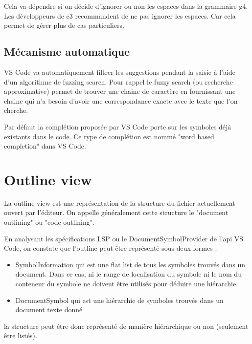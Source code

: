 \documentclass[
    iict, %
    il, %
]{heig-tb}
\begin{document}
Cela va dépendre si on décide d'ignorer ou non les espaces dans la grammaire g4.
Les développeurs de c3 recommandent de ne pas ignorer les espaces. Car cela permet de gérer plus de cas particuliers.

\subsection{Mécanisme automatique}
VS Code va automatiquement filtrer les suggestions pendant la saisie à l'aide d'un algorithme de fuzzing search.
Pour rappel le fuzzy search (ou recherche approximative) permet de trouver une chaine de caractère en fournissant une chaine qui n'a besoin d'avoir une correspondance exacte
avec le texte que l'on cherche.

Par défaut la complétion proposée par VS Code porte sur les symboles déjà existants dans le code.
Ce type de complétion est nommé "word based completion" dans VS Code.

\section{Outline view}

La outline view est une représentation de la structure du fichier actuellement ouvert par l'éditeur.
On appelle généralement cette structure le "document outlining" ou "code outlining".

En analysant les spécifications LSP ou le DocumentSymbolProvider de l'api VS Code, on constate que l'outline peut être représenté sous deux formes :

\begin{itemize}
    \item SymbolInformation qui est une flat list de tous les symboles trouvés dans un document. Dans ce cas, ni le range de localisation du symbole ni le nom du conteneur du symbole ne doivent être utilisés pour déduire une hiérarchie.
    \item DocumentSymbol qui est une hiérarchie de symboles trouvés dans un document texte donné
\end{itemize}

la structure peut être donc représenté de manière hiérarchique ou non (seulement être listés).

\end{document}
